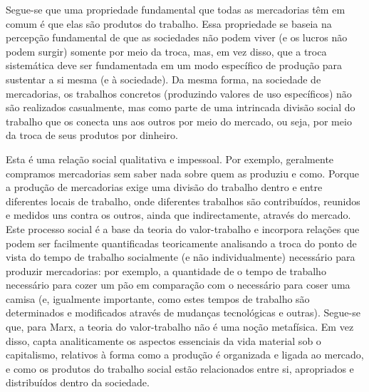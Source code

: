  \par 
Segue-se que uma propriedade fundamental que todas as mercadorias têm em comum é que elas são produtos do trabalho. Essa propriedade se baseia na percepção fundamental de que as sociedades não podem viver (e os lucros não podem surgir) somente por meio da troca, mas, em vez disso, que a troca sistemática deve ser fundamentada em um modo específico de produção para sustentar a si mesma (e à sociedade). Da mesma forma, na sociedade de mercadorias, os trabalhos concretos (produzindo valores de uso específicos) não são realizados casualmente, mas como parte de uma intrincada divisão social do trabalho que os conecta uns aos outros por meio do mercado, ou seja, por meio da troca de seus produtos por dinheiro.
 \par 
Esta é uma relação social qualitativa e impessoal. Por exemplo, geralmente compramos mercadorias sem saber nada sobre quem as produziu e como. Porque a produção de mercadorias exige uma divisão do trabalho dentro e entre diferentes locais de trabalho, onde diferentes trabalhos são contribuídos, reunidos e medidos uns contra os outros, ainda que indirectamente, através do mercado. Este processo social é a base da teoria do valor-trabalho e incorpora relações que podem ser facilmente quantificadas teoricamente analisando a troca do ponto de vista do tempo de trabalho socialmente (e não individualmente) necessário para produzir mercadorias: por exemplo, a quantidade de o tempo de trabalho necessário para cozer um pão em comparação com o necessário para coser uma camisa (e, igualmente importante, como estes tempos de trabalho são determinados e modificados através de mudanças tecnológicas e outras). Segue-se que, para Marx, a teoria do valor-trabalho não é uma noção metafísica. Em vez disso, capta analiticamente os aspectos essenciais da vida material sob o capitalismo, relativos à forma como a produção é organizada e ligada ao mercado, e como os produtos do trabalho social estão relacionados entre si, apropriados e distribuídos dentro da sociedade.
 \par 
